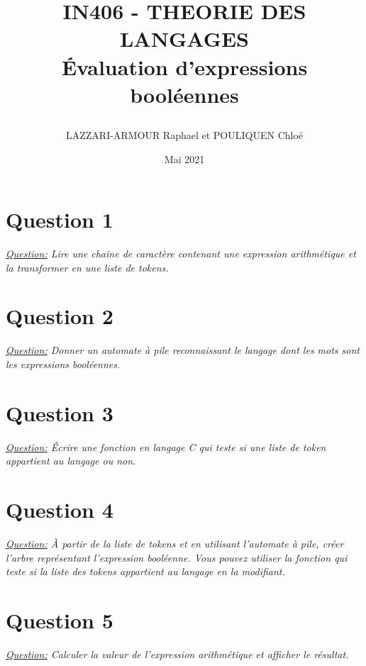 \documentclass{article}
\title{
IN406 - THEORIE DES LANGAGES\\
Évaluation d’expressions booléennes

}
\author{
LAZZARI-ARMOUR Raphael et POULIQUEN Chloé
}
\date{
Mai 2021
}
\begin{document}
\maketitle

\section{Question 1}
\textit{
\underline{Question:}
 Lire une chaîne de caractère contenant une expression arithmétique et la transformer en une liste de tokens.
} 


\section{Question 2}
\textit{
\underline{Question:} 
Donner un automate à pile reconnaissant le langage dont les mots sont les expressions
booléennes.
}

\section{Question 3}
\textit{
\underline{Question:}
 Écrire une fonction en langage C qui teste si une liste de token appartient au langage ou non.
}

\section{Question 4}
\textit{
\underline{Question:}
À partir de la liste de tokens et en utilisant l’automate à pile, créer l’arbre représentant l’expression booléenne. Vous pouvez utiliser la fonction qui teste si la liste des tokens appartient au langage en la modifiant.
}

\section{Question 5}
\textit{
\underline{Question:}
Calculer la valeur de l’expression arithmétique et afficher le résultat.
}
\end{document}
